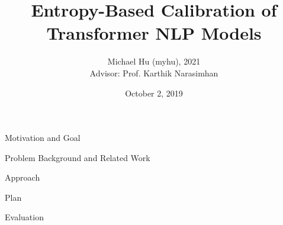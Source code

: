 \documentclass[12pt]{extarticle}
\title{Entropy-Based Calibration of Transformer NLP Models}
\author{Michael Hu (myhu), 2021 \\ 
Advisor: Prof. Karthik Narasimhan}
\date{October 2, 2019}
\begin{document}
\maketitle

\large{Motivation and Goal}

\large{Problem Background and Related Work}

\large{Approach}

\large{Plan}

\large{Evaluation}

%
%
\end{document}
